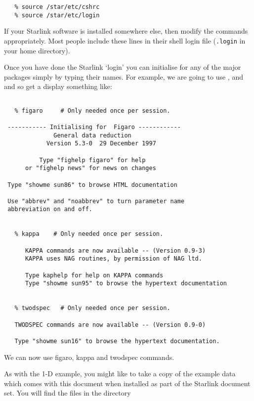 {
\scspec{\small}{ }
\begin{verbatim}
   % source /star/etc/cshrc
   % source /star/etc/login
\end{verbatim}
}

If your Starlink software is installed somewhere else,
then modify the commands appropriately.
Most people include these lines in their shell login file
(\verb+.login+ in your home directory).

Once you have done the Starlink `login' you can initialise for any of the
major packages simply by typing their names.
For example, we are going to use
\cite{figaro}, \cite{kappa} and
\cite{twodspec} and so get a display
something like:

{
\scspec{\small}{ }
\begin{verbatim}

   % figaro     # Only needed once per session.
 
 ----------- Initialising for  Figaro ------------
              General data reduction
            Version 5.3-0  29 December 1997
 
          Type "fighelp figaro" for help
      or "fighelp news" for news on changes
 
 Type "showme sun86" to browse HTML documentation
 
 Use "abbrev" and "noabbrev" to turn parameter name
 abbreviation on and off.


   % kappa    # Only needed once per session.

      KAPPA commands are now available -- (Version 0.9-3)
      KAPPA uses NAG routines, by permission of NAG ltd.

      Type kaphelp for help on KAPPA commands
      Type "showme sun95" to browse the hypertext documentation

 
   % twodspec   # Only needed once per session.
 
   TWODSPEC commands are now available -- (Version 0.9-0)
 
   Type "showme sun16" to browse the hypertext documentation.
\end{verbatim}
}

We can now use {\sc figaro}, {\sc kappa} and {\sc twodspec} commands.

As with the 1-D example, you might like to take a copy of the example data which comes
with this document when installed as part of the Starlink document set.
You will find the files in the directory


